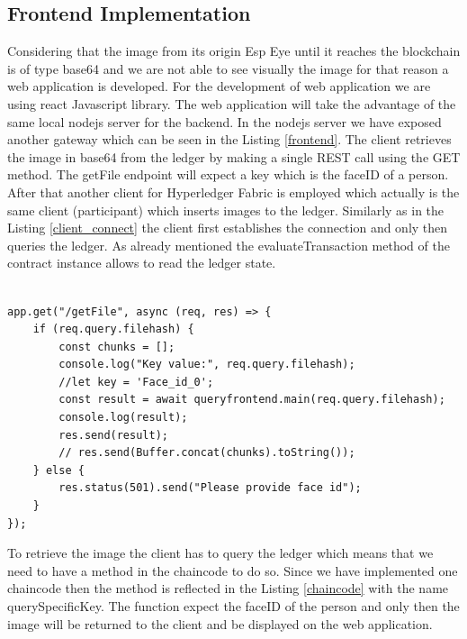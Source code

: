 \subsection{Frontend Implementation}

Considering that the image from its origin Esp Eye until it reaches the blockchain is of type {\selectfont base64} and we are not able to see visually the image for that reason a web application is developed. For the development of web application we are using react Javascript library. The web application will take the advantage of the same local nodejs server for the backend. In the nodejs server we have exposed another gateway which can be seen in the Listing \ref{frontend}. 
The client retrieves the image in base64 from the ledger by making a single REST call using the GET method. The {\selectfont getFile} endpoint will expect a key which is the faceID of a person. After that another client for Hyperledger Fabric is employed which actually is the same client (participant) which inserts images to the ledger. Similarly as in the Listing \ref{client_connect} the client first establishes the connection and only then queries the ledger. As already mentioned the {\selectfont evaluateTransaction} method of the {\selectfont contract} instance allows to read the ledger state.  

\begin{lstlisting}[caption={The API gateway serving the web application.},label=frontend, captionpos=b]

app.get("/getFile", async (req, res) => {
    if (req.query.filehash) {
        const chunks = [];
        console.log("Key value:", req.query.filehash);
        //let key = 'Face_id_0';
        const result = await queryfrontend.main(req.query.filehash);
        console.log(result);
        res.send(result);
        // res.send(Buffer.concat(chunks).toString());
    } else {
        res.status(501).send("Please provide face id");
    }
});

\end{lstlisting}

To retrieve the image the client has to query the ledger which means that we need to have a method in the chaincode to do so. Since we have implemented one chaincode then the method is reflected in the Listing \ref{chaincode} with the name {\selectfont querySpecificKey}. The function expect the faceID of the person and only then the image will be returned to the client and be displayed on the web application. 









